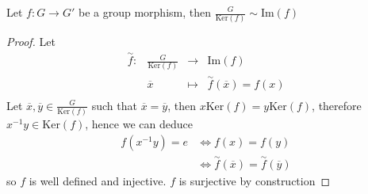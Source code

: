 \begin{theorem}
  Let $ f : G \longrightarrow G' $ be a group morphism,
  then $\frac{G}{\text{Ker}  (f) } \sim \text{Im}  (f) $ 
\end{theorem}
\begin{proof}
   Let \[
\begin{array}{cccc}
      \overset{\sim}{f}  : &  \frac{G}{\text{Ker}  (f) }  & \longrightarrow & \text{Im}  (f)  \\

           &    \overline{x}& \longmapsto     & 
           \overset{\sim}{f} ( \overline{x}) = 
           f(x) \\ 
\end{array}
\]
Let $\overline{x}, \overline{y} \in  \frac{G}{\text{Ker}  (f) } $ such that $\overline{x} = \overline{y}$, then 
$x \text{Ker}  (f) = y \text{Ker}  (f)$, therefore 
$x^{-1}y \in  \text{Ker}  (f) $, hence we can deduce
\begin{align*}
  f(x^{-1}y)  = e &\iff f(x) = f(y)  \\
                  &\iff \overset{\sim}{f} (\overline{x})  = 
  \overset{\sim}{f} (\overline{y}) 
\end{align*}
so $f $ is well defined and injective. 
$f $ is surjective by construction
\end{proof}
